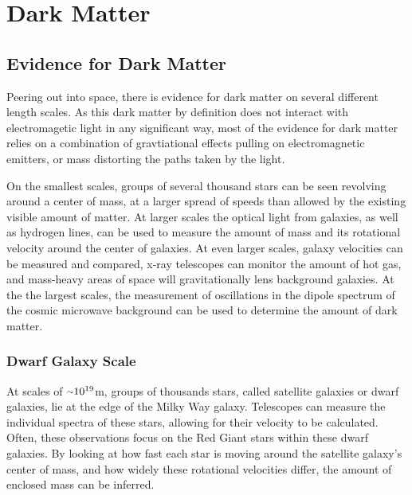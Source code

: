 \cleartooddpage[\thispagestyle{empty}]
\chapter{Dark Matter}

\section{Evidence for Dark Matter}

Peering out into space, there is evidence for dark matter on several different length scales.
As this dark matter by definition does not interact with electromagetic light in any significant way, most of the evidence for dark matter relies on a combination of gravtiational effects pulling on electromagnetic emitters, or mass distorting the paths taken by the light.

On the smallest scales, groups of several thousand stars can be seen revolving around a center of mass, at a larger spread of speeds than allowed by the existing visible amount of matter.
At larger scales the optical light from galaxies, as well as hydrogen lines, can be used to measure the amount of mass and its rotational velocity around the center of galaxies.
At even larger scales, galaxy velocities can be measured and compared, x-ray telescopes can monitor the amount of hot gas, and mass-heavy areas of space will gravitationally lens background galaxies.
At the the largest scales, the measurement of oscillations in the dipole spectrum of the cosmic microwave background can be used to determine the amount of dark matter.


\subsection{Dwarf Galaxy Scale}
At scales of $\nicetilde 10^{19}$m, groups of thousands stars, called satellite galaxies or dwarf galaxies, lie at the edge of the Milky Way galaxy.
Telescopes can measure the individual spectra of these stars, allowing for their velocity to be calculated.
Often, these observations focus on the Red Giant stars within these dwarf galaxies.
By looking at how fast each star is moving around the satellite galaxy's center of mass, and how widely these rotational velocities differ, the amount of enclosed mass can be inferred.

